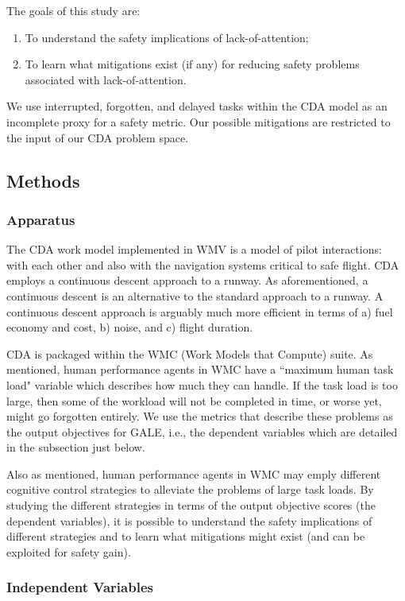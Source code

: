 \documentclass[journal]{IEEEtran}
\newcommand{\be}{\begin{enumerate}}
\newcommand{\ee}{\end{enumerate}}
\newcommand{\ADD}[1]{#1}
\begin{document}
The goals of this study are:
\be
\item
To understand the safety implications of lack-of-attention;
\item
To learn what mitigations exist (if any) for reducing safety problems associated with lack-of-attention.
\ee
\ADD{We use interrupted, forgotten, and delayed tasks within the CDA model as an incomplete proxy for a safety metric.
Our possible mitigations are restricted to the input of our CDA problem space.}


\subsection{Methods}
\subsubsection{Apparatus}

 
The CDA work model implemented in WMV is a model of pilot interactions: with each other and also with the navigation systems critical to safe flight.  
CDA employs a continuous descent approach to a runway. 
As aforementioned, a continuous descent is an alternative to the standard approach to a runway.
A continuous descent approach is arguably much more efficient in terms of a) fuel economy and cost, b) noise, and c) flight duration.

CDA is packaged within the WMC (Work Models that Compute) suite.  
As mentioned, human performance agents in WMC have a ``maximum human task load" variable which describes how much they can handle.  
If the task load is too large, then some of the workload will not be completed in time, or worse yet, might go forgotten entirely.  
We use the metrics that describe these problems as the output objectives for GALE, i.e., the dependent variables which are detailed in the subsection just below.

Also as mentioned, human performance agents in WMC may emply different cognitive
control strategies to alleviate the problems of large task loads.   
By studying the different strategies in terms of the output objective scores (the dependent variables), it is possible to understand the safety implications of different strategies and to learn what mitigations might exist (and can be exploited for safety gain).


\subsubsection{Independent Variables}
\end{document}
